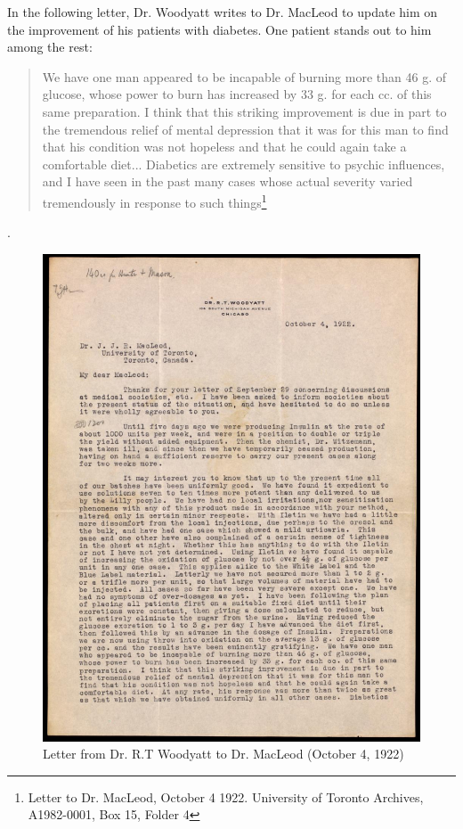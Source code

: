 \documentclass[12pt]{article}
\begin{document}
In the following letter, Dr. Woodyatt writes to Dr. MacLeod to update him on the improvement of his patients with diabetes. One patient stands out to him among the rest:
\begin{quote} \singlespacing
We have one man appeared to be incapable of burning more than 46 g. of glucose, whose power to burn has increased by 33 g. for each cc. of this same preparation. I think that this striking improvement is due in part to the tremendous relief of mental depression that it was for this man to find that his condition was not hopeless and that he could again take a comfortable diet... Diabetics are extremely sensitive to psychic influences, and I have seen in the past many cases whose actual severity varied tremendously in response to such things\footnote{Letter to Dr. MacLeod, October 4 1922. University of Toronto Archives, A1982-0001, Box 15, Folder 4}\end{quote}. 

\begin{figure}[H]
\centering
  \includegraphics [width=5in]{mental_man}
  \caption{Letter from Dr. R.T Woodyatt to Dr. MacLeod (October 4, 1922)}
  \label{fig: Letter from Dr. R. T. Woodyatt to Dr. MacLeod P. 1}
\end{figure}
\end{document}
